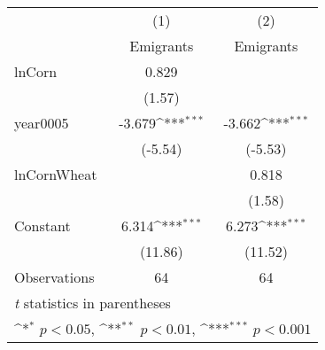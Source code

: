 {
\def\sym#1{\ifmmode^{#1}\else\(^{#1}\)\fi}
\begin{tabular}{l*{2}{c}}
\toprule
                    &\multicolumn{1}{c}{(1)}&\multicolumn{1}{c}{(2)}\\
                    &\multicolumn{1}{c}{Emigrants}&\multicolumn{1}{c}{Emigrants}\\
\midrule
lnCorn              &       0.829         &                     \\
                    &      (1.57)         &                     \\
\addlinespace
year0005            &      -3.679\sym{***}&      -3.662\sym{***}\\
                    &     (-5.54)         &     (-5.53)         \\
\addlinespace
lnCornWheat         &                     &       0.818         \\
                    &                     &      (1.58)         \\
\addlinespace
Constant            &       6.314\sym{***}&       6.273\sym{***}\\
                    &     (11.86)         &     (11.52)         \\
\midrule
Observations        &          64         &          64         \\
\bottomrule
\multicolumn{3}{l}{\footnotesize \textit{t} statistics in parentheses}\\
\multicolumn{3}{l}{\footnotesize \sym{*} \(p<0.05\), \sym{**} \(p<0.01\), \sym{***} \(p<0.001\)}\\
\end{tabular}
}
